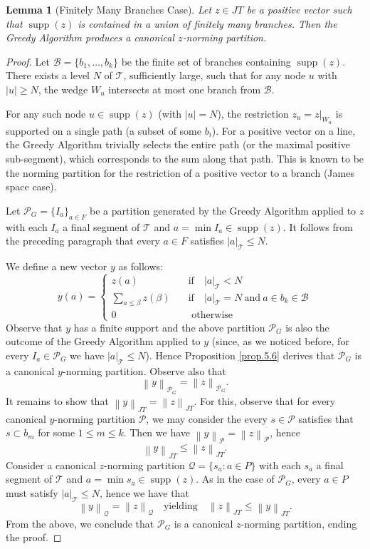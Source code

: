 \documentclass[11pt,a4paper]{amsart}
\newtheorem{lemma}[theorem]{Lemma}
\newcommand{\JT}{JT}
\newcommand{\Tree}{\mathcal{T}}
\newcommand{\norm}[1]{\left\lVert#1\right\rVert}
\newcommand{\supp}{\operatorname{supp}}
\begin{document}
\begin{lemma}[Finitely Many Branches Case]\label{L5.8}
    Let $z \in \JT$ be a positive vector such that $\supp(z)$ is contained in a union of finitely many branches. Then the Greedy Algorithm produces a canonical $z$-norming partition.
\end{lemma}

\begin{proof}
    Let $\mathcal{B} = \{b_1, \dots, b_k\}$ be the finite set of branches containing $\supp(z)$.
    There exists a level $N$ of $\Tree$, sufficiently large, such that for any node $u$ with $|u| \ge N$, the wedge $W_u$ intersects at most one branch from $\mathcal{B}$.
    
    For any such node $u\in \supp(z)$ (with $|u| = N$), the restriction $z_u = z|_{W_u}$ is supported on a single path (a subset of some $b_i$). For a positive vector on a line, the Greedy Algorithm trivially selects the entire path (or the maximal positive sub-segment), which corresponds to the sum along that path. This is known to be the norming partition for the restriction of a positive vector to a branch (James space case).
    
    Let $\mathcal{P}_G = \{I_a\}_{a\in F}$ be a partition generated by the Greedy Algorithm applied to $z$ with each $I_a$ a final segment of $\Tree$ and $ a = \min I_a \in \supp(z)$. It follows from the preceding paragraph that every $a\in F$ 
    satisfies $|a|_\Tree \le N$.
    
    We define a new vector $y$ as follows: 
    \[
     y(a) = 
     \begin{cases}
      z(a) \quad & \text{if} \quad  |a|_\Tree < N \\
      \sum_{a \le \beta} z(\beta) \quad & \text{if}  \quad  |a|_\Tree = N \: \text{and} \: a\in b_k \in \mathcal{B} \\
      0 \quad & \text{ otherwise}
     \end{cases}\]
     Observe that $y$ has a finite support and the above partition $\mathcal{P}_G$ is also the outcome of the Greedy Algorithm applied to $y$ (since, as we noticed before, for every $I_a\in \mathcal{P}_G$ we have $|a|_\Tree \le N$). Hence Proposition \ref{prop.5.6} derives that $\mathcal{P}_G$ is a canonical $y$-norming partition. Observe also that       \[ \norm{y}_{\mathcal{P}_G} = \norm{z}_{\mathcal{P}_G}. \]
     It remains to show that    $ \norm{y}_{\JT}= \norm{z}_{\JT}$. For this, observe that for every canonical $y$-norming partition $\mathcal{P}$, we may consider the every $ s\in\mathcal{P}$ satisfies that $ s\subset b_m$ for some $1\le m \le k$. Then we have $\norm{y}_{\mathcal{P}} = \norm{z}_{\mathcal{P}}$, hence 
        \[ \norm{y}_{\JT} \le \norm{z}_{\JT}. \]
       Consider a canonical $z$-norming partition $\mathcal{Q} = \{ s_a : a\in P\} $ with each $s_a$ a final segment of $\Tree$ and $a= \min s_a \in \supp(z)$. As in the case of $\mathcal{P}_G$, every $a\in P$ must satisfy $|a|_\Tree \le N$, hence we have that 
    \[ \norm{y}_{\mathcal{Q}} = \norm{z}_{\mathcal{Q}} \quad \text{yielding}  \quad  \norm{z}_{\JT} \le \norm{y}_{\JT}. \]
    From the above, we conclude that $\mathcal{P}_G$ is a canonical $z$-norming partition, ending the proof.


\end{proof}
\end{document}
